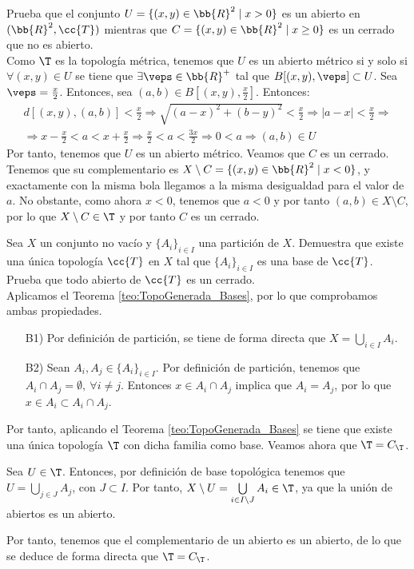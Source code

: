 \begin{ejercicio}
    Prueba que el conjunto $U=\{(x,y)\in \bb{R}^2\mid x>0\}$ es un abierto en $(\bb{R}^2, \cc{T})$ mientras que $C=\{(x,y)\in \bb{R}^2\mid x\geq 0\}$ es un cerrado que no es abierto.\\

    Como $\T$ es la topología métrica, tenemos que $U$ es un abierto métrico si y solo si $\forall (x,y)\in U$ se tiene que $\exists \veps\in \bb{R}^+$ tal que $B[(x,y),\veps]\subset U$. Sea $\veps=\frac{x}{2}$. Entonces, sea $(a,b)\in B\left[(x,y),\frac{x}{2}\right]$. Entonces:
    \begin{multline*}
        d[(x,y),(a,b)]<\frac{x}{2}\Longrightarrow \sqrt{(a-x)^2 + (b-y)^2} < \frac{x}{2} \Longrightarrow |a-x| < \frac{x}{2} \Longrightarrow \\ \Longrightarrow x-\frac{x}{2} < a < x+\frac{x}{2} \Longrightarrow \frac{x}{2} < a < \frac{3x}{2} \Longrightarrow 0<a \Longrightarrow (a,b)\in U
    \end{multline*}
    Por tanto, tenemos que $U$ es un abierto métrico. Veamos que $C$ es un cerrado. Tenemos que su complementario es $X\setminus C = \{(x,y)\in \bb{R}^2\mid x< 0\}$, y exactamente con la misma bola llegamos a la misma desigualdad para el valor de $a$. No obstante, como ahora $x<0$, tenemos que $a<0$ y por tanto $(a,b)\in X\setminus C$, por lo que $X\setminus C\in \T$ y por tanto $C$ es un cerrado.
\end{ejercicio}


\begin{ejercicio}
    Sea $X$ un conjunto no vacío y $\{A_i\}_{i\in I}$ una partición de $X$. Demuestra que existe una única topología $\cc{T}$ en $X$ tal que $\{A_i\}_{i\in I}$ es una base de $\cc{T}$. Prueba que todo abierto de $\cc{T}$ es un cerrado.\\

    Aplicamos el Teorema \ref{teo:TopoGenerada_Bases}, por lo que comprobamos ambas propiedades.
    \begin{enumerate}
        \item[B1)] Por definición de partición, se tiene de forma directa que $X=\bigcup\limits_{i\in I}A_i$.
        \item[B2)] Sean $A_i,A_j\in \{A_i\}_{i\in I}$. Por definición de partición, tenemos que $A_i\cap A_j=\emptyset,~\forall i\neq j$. Entonces $x\in A_i\cap A_j$ implica que $A_i=A_j$, por lo que $x\in A_i\subset A_i\cap A_j$.
    \end{enumerate}
    Por tanto, aplicando el Teorema \ref{teo:TopoGenerada_Bases} se tiene que existe una única topología $\T$ con dicha familia como base. Veamos ahora que $\T=C_\T$.
    
    Sea $U\in \T$. Entonces, por definición de base topológica tenemos que $U=\bigcup\limits_{j\in J}A_j$, con $J\subset I$. Por tanto, $X\setminus U = \bigcup\limits_{i\in I\setminus J}A_i\in \T$, ya que la unión de abiertos es un abierto.

    Por tanto, tenemos que el complementario de un abierto es un abierto, de lo que se deduce de forma directa que $\T=C_\T$.
\end{ejercicio}

